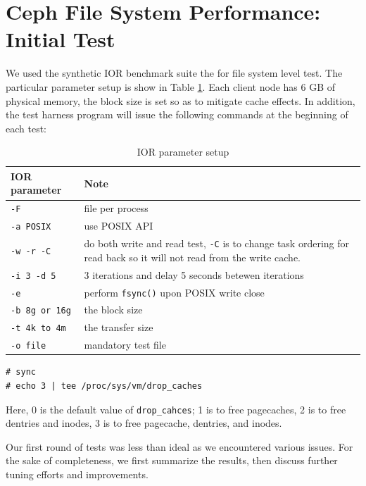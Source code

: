 \documentclass{article}
\begin{document}
\section{Ceph File System Performance: Initial Test}

We used the synthetic IOR benchmark suite the for file system level test. The particular
parameter setup is show in Table \ref{tbl:ior}. Each client node has 6 GB of
physical memory, the block size is set so as to mitigate cache effects. In
addition, the test harness program will issue the following commands at the
beginning of each test:




\begin{table}[tb]
\centering
\begin{tabular}{p{1.5in} | p{3in}}
    \toprule
    IOR parameter & Note \\ \midrule
    \verb!-F! & file per process \\ \midrule
    \verb!-a POSIX! & use POSIX API \\ \midrule
    \verb!-w -r -C! & do both write and read test, \verb!-C! is to change task
        ordering for read back so it will not read from the write cache. \\ \midrule
    \verb!-i 3 -d 5! & 3 iterations and delay 5 seconds betewen iterations \\
    \midrule  
    \verb!-e! & perform \verb!fsync()! upon POSIX write close \\ \midrule
    \verb!-b 8g or 16g! & the block size \\ \midrule
    \verb!-t 4k to 4m! & the transfer size \\ \midrule
    \verb!-o file! & mandatory test file  \\    
    \bottomrule
\end{tabular}
\caption{IOR parameter setup}
\label{tbl:ior}
\end{table}


\begin{Verbatim}
# sync
# echo 3 | tee /proc/sys/vm/drop_caches
\end{Verbatim}


Here, 0 is the default value of \verb!drop_cahces!; 1 is to free pagecaches, 2
is to free dentries and inodes, 3 is to free pagecache, dentries, and inodes.


Our first round of tests was less than ideal as we encountered various issues. For
the sake of completeness, we first summarize the results, then discuss
further tuning efforts and improvements.
\end{document}
